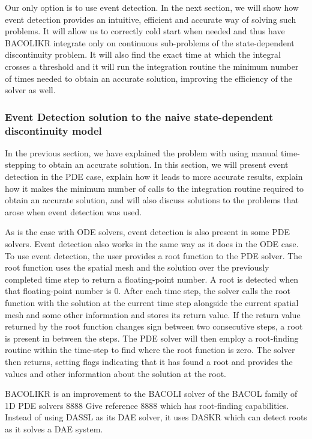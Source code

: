 \documentclass{article}
\begin{document}
Our only option is to use event detection. In the next section, we will show how event detection provides an intuitive, efficient and accurate way of solving such problems. It will allow us to correctly cold start when needed and thus have BACOLIKR integrate only on continuous sub-problems of the state-dependent discontinuity problem. It will also find the exact time at which the integral crosses a threshold and it will run the integration routine the minimum number of times needed to obtain an accurate solution, improving the efficiency of the solver as well.

\subsubsection{Event Detection solution to the naive state-dependent discontinuity model}
\label{subsubsection:pde_state_event_detection}
In the previous section, we have explained the problem with using manual time-stepping to obtain an accurate solution. In this section, we will present event detection in the PDE case, explain how it leads to more accurate results, explain how it makes the minimum number of calls to the integration routine required to obtain an accurate solution, and will also discuss solutions to the problems that arose when event detection was used.

As is the case with ODE solvers, event detection is also present in some PDE solvers. Event detection also works in the same way as it does in the ODE case. To use event detection, the user provides a root function to the PDE solver. The root function uses the spatial mesh and the solution over the previously completed time step to return a floating-point number. A root is detected when that floating-point number is 0. After each time step, the solver calls the root function with the solution at the current time step alongside the current spatial mesh and some other information and stores its return value. If the return value returned by the root function changes sign between two consecutive steps, a root is present in between the steps. The PDE solver will then employ a root-finding routine within the time-step to find where the root function is zero. The solver then returns, setting flags indicating that it has found a root and provides the values and other information about the solution at the root.

BACOLIKR is an improvement to the BACOLI solver of the BACOL family of 1D PDE solvers 8888 Give reference 8888 which has root-finding capabilities. Instead of using DASSL as its DAE solver, it uses DASKR which can detect roots as it solves a DAE system. 
\end{document}
